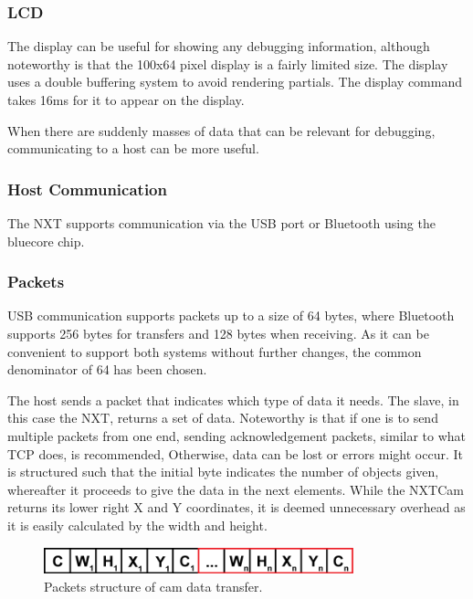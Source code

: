\subsubsection*{LCD}
The display can be useful for showing any debugging information, although noteworthy is that the 100x64 pixel display is a fairly limited size. The display uses a double buffering system to avoid rendering partials. The display command takes 16ms for it to appear on the display.

When there are suddenly masses of data that can be relevant for debugging, communicating to a host can be more useful.

\subsubsection*{Host Communication}
The NXT supports communication via the USB port or Bluetooth using the bluecore chip.

\subsubsection*{Packets}
USB communication supports packets up to a size of 64 bytes, where Bluetooth supports 256 bytes for transfers and 128 bytes when receiving. As it can be convenient to support both systems without further changes, the common denominator of 64 has been chosen.

The host sends a packet that indicates which type of data it needs. The slave, in this case the NXT, returns a set of data. Noteworthy is that if one is to send multiple packets from one end, sending acknowledgement packets, similar to what TCP does, is recommended, Otherwise, data can be lost or errors might occur.
It is structured such that the initial byte indicates the number of objects given, whereafter it proceeds to give the data in the next elements. While the NXTCam returns its lower right X and Y coordinates, it is deemed unnecessary overhead as it is easily calculated by the width and height.

\begin{figure}[H]
    \label{software_packet_cam}
    \centering
    \includegraphics[width=0.8\textwidth]{Images/Software/NXT/packet_cam.png}
    \caption{Packets structure of cam data transfer.}
\end{figure}

